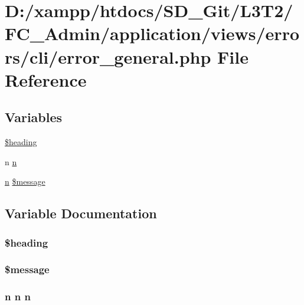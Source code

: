 \hypertarget{cli_2error__general_8php}{}\section{D\+:/xampp/htdocs/\+S\+D\+\_\+\+Git/\+L3\+T2/\+F\+C\+\_\+\+Admin/application/views/errors/cli/error\+\_\+general.php File Reference}
\label{cli_2error__general_8php}
\subsection*{Variables}
\begin{DoxyCompactItemize}
\item 
\hyperlink{cli_2error__general_8php_a196169be7715d466e3310388b096598c}{\$heading}
\item 
n \hyperlink{cli_2error__general_8php_ace0fd03cd383f20ce6ea63247a207294}{n}
\item 
\hyperlink{cli_2error__general_8php_ace0fd03cd383f20ce6ea63247a207294}{n} \hyperlink{cli_2error__general_8php_aaba2b6aee423b3b5e46000f90b4c8c7f}{\$message}
\end{DoxyCompactItemize}


\subsection{Variable Documentation}
\hypertarget{cli_2error__general_8php_a196169be7715d466e3310388b096598c}{}
\subsubsection[{\$heading}]{\setlength{\rightskip}{0pt plus 5cm}\$heading}\label{cli_2error__general_8php_a196169be7715d466e3310388b096598c}
\hypertarget{cli_2error__general_8php_aaba2b6aee423b3b5e46000f90b4c8c7f}{}
\subsubsection[{\$message}]{ \$message}\label{cli_2error__general_8php_aaba2b6aee423b3b5e46000f90b4c8c7f}
\hypertarget{cli_2error__general_8php_ace0fd03cd383f20ce6ea63247a207294}{}
\subsubsection[{n}]{\setlength{\rightskip}{0pt plus 5cm}n n n}\label{cli_2error__general_8php_ace0fd03cd383f20ce6ea63247a207294}
